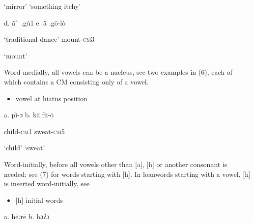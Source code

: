 \begin{styleindexi}
       \textsc{‘}mirror’                         ‘something itchy’                      
\end{styleindexi}

\begin{styleindexi}
  d.   ã\`{} .gù1                       e.   ã\={} .gō-lò
\end{styleindexi}

\begin{styleindexi}
       ‘traditional dance’         mount-\textsc{cm3}  
\end{styleindexi}

\begin{styleindexi}
                                         ‘mount’
\end{styleindexi}

Word-medially, all vowels can be a nucleus, see two examples in (6), each of which contains a CM consisting only of a vowel.

\begin{itemize}
\item \begin{styleindexi}
  \label{bkm:Ref486614751}vowel at hiatus position 
\end{styleindexi}\end{itemize}
\begin{styleindexi}
          a.   pì-ɔ                              b.  kā.fū-ō            
\end{styleindexi}

\begin{styleindexi}
              child-\textsc{cm1}                            sweat-\textsc{cm5}
\end{styleindexi}

\begin{styleindexi}
              ‘child’                              ‘sweat’     
\end{styleindexi}

Word-initially, before all vowels other than [a], [h] or another consonant is needed; see (7) for words starting with [h].  In loanwords starting with a vowel, [h] is inserted word-initially, see  

\begin{itemize}
\item \begin{styleindexi}
    \label{bkm:Ref359766855}[h] initial words
\end{styleindexi}\end{itemize}
\begin{styleindexi}
            a.   hēːrē                                b.   hɔʔɔ           
\end{styleindexi}

